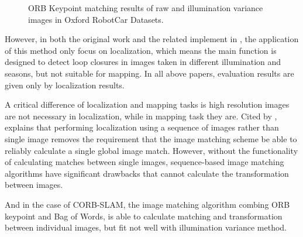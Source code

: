 \begin{figure}[H]
	\centering
	\vfill
\caption{ORB Keypoint matching results of raw and illumination variance images in Oxford RobotCar Datasets.}
\label{fig:robotcarmatches}
\end{figure}

However, in both the original work \cite{maddern2014illumination} and the related implement in \cite{arroyo2014bidirectional,arroyo2014fast,arroyo2015towards,arroyo2016openable}, the application of this method only focus on localization, which means the main function is designed to detect loop closures in images taken in different illumination and seasons, but not suitable for mapping. In all above papers, evaluation results are given only by localization results.

A critical difference of localization and mapping tasks is high resolution images are not necessary in localization, while in mapping task they are. Cited by \cite{arroyo2014bidirectional}, \cite{milford2012visual}  explains that performing localization using a sequence of images rather than single image removes the requirement that the image matching scheme be able to reliably calculate a single global image match. However, without the functionality of calculating matches between single images, sequence-based image matching algorithms have significant drawbacks that cannot calculate the transformation between images.

And in the case of CORB-SLAM, the image matching algorithm combing ORB keypoint and Bag of Words, is able to calculate matching and transformation between individual images, but fit not well with illumination variance method.

\newpage
